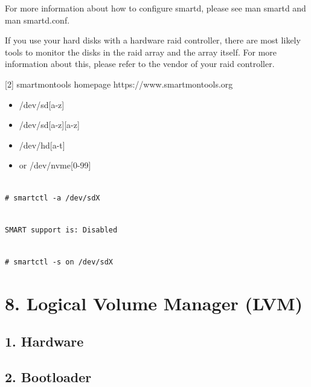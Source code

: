 For more information about how to configure smartd, please see man smartd and man smartd.conf.

If you use your hard disks with a hardware raid controller, there are most likely tools to monitor the disks in the raid array and the array itself. For more information about this, please refer to the vendor of your raid controller.

[2] smartmontools homepage https://www.smartmontools.org

\begin{itemize}[leftmargin=2cm]

	\item /dev/sd[a-z]

	\item /dev/sd[a-z][a-z]

	\item /dev/hd[a-t]

	\item or /dev/nvme[0-99]

\end{itemize}

\begin{lstlisting}

# smartctl -a /dev/sdX

\end{lstlisting}

\begin{lstlisting}

SMART support is: Disabled

\end{lstlisting}

\begin{lstlisting}

# smartctl -s on /dev/sdX

\end{lstlisting}


\section{8. Logical Volume Manager (LVM)}

\subsection{1. Hardware}

\subsection{2. Bootloader}

